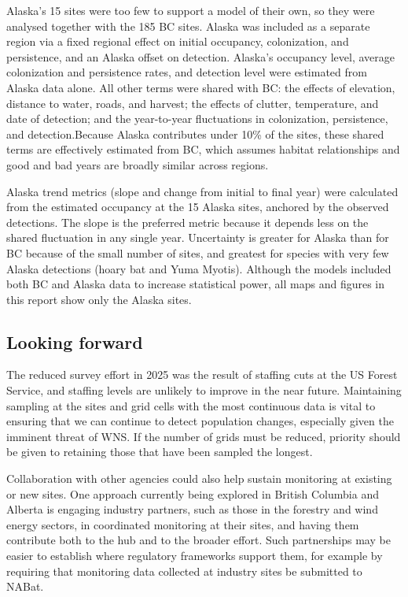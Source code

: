 \documentclass[
  letterpaper,
  DIV=11,
  numbers=noendperiod]{scrartcl}
\begin{document}
Alaska's 15 sites were too few to support a model of their own, so they
were analysed together with the 185 BC sites. Alaska was included as a
separate region via a fixed regional effect on initial occupancy,
colonization, and persistence, and an Alaska offset on detection.
Alaska's occupancy level, average colonization and persistence rates,
and detection level were estimated from Alaska data alone. All other
terms were shared with BC: the effects of elevation, distance to water,
roads, and harvest; the effects of clutter, temperature, and date of
detection; and the year-to-year fluctuations in colonization,
persistence, and detection.Because Alaska contributes under 10\% of the
sites, these shared terms are effectively estimated from BC, which
assumes habitat relationships and good and bad years are broadly similar
across regions.

Alaska trend metrics (slope and change from initial to final year) were
calculated from the estimated occupancy at the 15 Alaska sites, anchored
by the observed detections. The slope is the preferred metric because it
depends less on the shared fluctuation in any single year. Uncertainty
is greater for Alaska than for BC because of the small number of sites,
and greatest for species with very few Alaska detections (hoary bat and
Yuma Myotis). Although the models included both BC and Alaska data to
increase statistical power, all maps and figures in this report show
only the Alaska sites.

\subsection{Looking forward}\label{looking-forward}

The reduced survey effort in 2025 was the result of staffing cuts at the
US Forest Service, and staffing levels are unlikely to improve in the
near future. Maintaining sampling at the sites and grid cells with the
most continuous data is vital to ensuring that we can continue to detect
population changes, especially given the imminent threat of WNS. If the
number of grids must be reduced, priority should be given to retaining
those that have been sampled the longest.

Collaboration with other agencies could also help sustain monitoring at
existing or new sites. One approach currently being explored in British
Columbia and Alberta is engaging industry partners, such as those in the
forestry and wind energy sectors, in coordinated monitoring at their
sites, and having them contribute both to the hub and to the broader
effort. Such partnerships may be easier to establish where regulatory
frameworks support them, for example by requiring that monitoring data
collected at industry sites be submitted to NABat.
\end{document}
